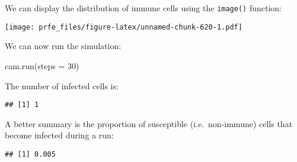 \documentclass[
  12pt,
  a4paper]{book}
\newenvironment{Shaded}{\begin{snugshade}}{\end{snugshade}}
\newcommand{\AttributeTok}[1]{\textcolor[rgb]{0.77,0.63,0.00}{#1}}
\newcommand{\ConstantTok}[1]{\textcolor[rgb]{0.00,0.00,0.00}{#1}}
\newcommand{\DecValTok}[1]{\textcolor[rgb]{0.00,0.00,0.81}{#1}}
\newcommand{\FunctionTok}[1]{\textcolor[rgb]{0.00,0.00,0.00}{#1}}
\newcommand{\NormalTok}[1]{#1}
\newcommand{\SpecialCharTok}[1]{\textcolor[rgb]{0.00,0.00,0.00}{#1}}
\newcommand{\StringTok}[1]{\textcolor[rgb]{0.31,0.60,0.02}{#1}}
\begin{document}
We can display the distribution of immune cells using the \texttt{image()} function:

\begin{Shaded}
\end{Shaded}

\texttt{[image: prfe\_files/figure-latex/unnamed-chunk-620-1.pdf]}

We can now run the simulation:

\begin{Shaded}
\begin{Highlighting}[]
\FunctionTok{cam.run}\NormalTok{(}\AttributeTok{steps =} \DecValTok{30}\NormalTok{)}
\end{Highlighting}
\end{Shaded}

The number of infected cells is:

\begin{Shaded}
\end{Shaded}

\begin{verbatim}
## [1] 1
\end{verbatim}

A better summary is the proportion of susceptible (i.e.~non-immune) cells that become infected during a run:

\begin{Shaded}
\end{Shaded}

\begin{verbatim}
## [1] 0.005
\end{verbatim}
\end{document}
